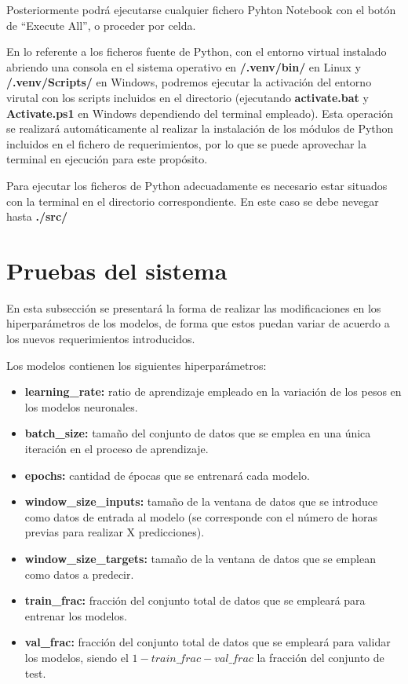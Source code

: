 
Posteriormente podrá ejecutarse cualquier fichero Pyhton Notebook con el botón de ``Execute All'', o proceder por celda.

En lo referente a los ficheros fuente de Python, con el entorno virtual instalado abriendo una consola en el sistema operativo en \textbf{/.venv/bin/} en Linux y \textbf{/.venv/Scripts/}
en Windows, podremos ejecutar la activación del entorno virutal con los scripts incluidos en el directorio (ejecutando \linebreak \textbf{activate.bat} y \textbf{Activate.ps1} en Windows dependiendo del terminal empleado).
Esta operación se realizará automáticamente al realizar la instalación de los módulos de Python incluidos en el fichero de requerimientos, por lo que se puede aprovechar la terminal en ejecución para 
este propósito.

Para ejecutar los ficheros de Python adecuadamente es necesario estar situados con la terminal en el directorio correspondiente. En este caso se debe nevegar hasta \textbf{./src/}

\section{Pruebas del sistema}
En esta subsección se presentará la forma de realizar las modificaciones en los hiperparámetros de los modelos, de forma que estos puedan variar de acuerdo a los nuevos requerimientos introducidos.

Los modelos contienen los siguientes hiperparámetros:
\begin{itemize}
    \item \textbf{learning\_rate:} ratio de aprendizaje empleado en la variación de los pesos en los modelos neuronales.
    \item \textbf{batch\_size:} tamaño del conjunto de datos que se emplea en una única iteración en el proceso
        de aprendizaje.
    \item \textbf{epochs:} cantidad de épocas que se entrenará cada modelo.
    \item \textbf{window\_size\_inputs:} tamaño de la ventana de datos que se introduce como datos de entrada al modelo
        (se corresponde con el número de horas previas para realizar X predicciones).
    \item \textbf{window\_size\_targets:} tamaño de la ventana de datos que se emplean como datos a predecir.
    \item \textbf{train\_frac:} fracción del conjunto total de datos que se empleará para entrenar los modelos.
    \item \textbf{val\_frac:} fracción del conjunto total de datos que se empleará para validar los modelos, siendo el 
        \(1 - train\_frac - val\_frac\) la fracción del conjunto de test.
\end{itemize}

